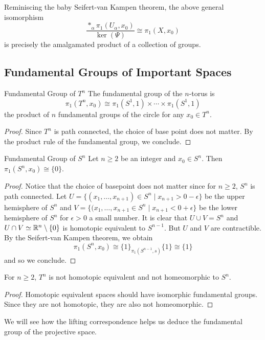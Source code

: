 \documentclass[a4paper]{article}
\begin{document}
Reminiscing the baby Seifert-van Kampen theorem, the above general isomorphism $$\frac{\ast_\alpha\pi_1(U_\alpha,x_0)}{\ker(\Psi)}\cong\pi_1(X,x_0)$$ is precisely the amalgamated product of a collection of groups. 

\subsection{Fundamental Groups of Important Spaces}
\begin{thm}{Fundamental Group of $T^n$}{} The fundamental group of the $n$-torus is $$\pi_1(T^n,x_0)\cong\pi_1(S^1,1)\times\cdots\times\pi_1(S^1,1)$$ the product of $n$ fundamental groups of the circle for any $x_0\in T^n$. \tcbline
\begin{proof}
Since $T^n$ is path connected, the choice of base point does not matter. By the product rule of the fundamental group, we conclude. 
\end{proof}
\end{thm}

\begin{thm}{Fundamental Group of $S^n$}{} Let $n\geq 2$ be an integer and $x_0\in S^n$. Then $\pi_1(S^n,x_0)\cong\{0\}$. \tcbline
\begin{proof}
Notice that the choice of basepoint does not matter since for $n\geq 2$, $S^n$ is path connected. Let $U=\{(x_1,\dots,x_{n+1})\in S^n\;|\;x_{n+1}>0-\epsilon\}$ be the upper hemisphere of $S^n$ and $V=\{(x_1,\dots,x_{n+1}\in S^n\;|\; x_{n+1}<0+\epsilon\}$ be the lower hemisphere of $S^n$ for $\epsilon>0$ a small number. It is clear that $U\cup V=S^n$ and $U\cap V\simeq\mathbb{R}^n\setminus\{0\}$ is homotopic equivalent to $S^{n-1}$. But $U$ and $V$ are contractible. By the Seifert-van Kampen theorem, we obtain $$\pi_1(S^n,x_0)\cong\{1\}_{\pi_1(S^{n-1},s)}\{1\}\cong\{1\}$$ and so we conclude. 
\end{proof}
\end{thm}

\begin{crl}{}{} For $n\geq 2$, $T^n$ is not homotopic equivalent and not homeomorphic to $S^n$. \tcbline
\begin{proof}
Homotopic equivalent spaces should have isomorphic fundamental groups. Since they are not homotopic, they are also not homeomorphic. 
\end{proof}
\end{crl}

We will see how the lifting correspondence helps us deduce the fundamental group of the projective space. 
\end{document}
